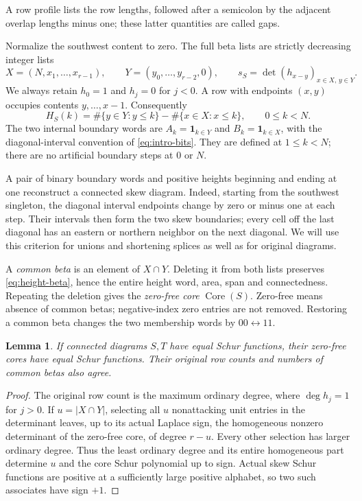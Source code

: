 \documentclass[11pt,a4paper]{amsart}
\numberwithin{equation}{section}
\theoremstyle{plain}
\newtheorem{lemma}[theorem]{Lemma}
\theoremstyle{definition}
\newcommand{\one}{\mathbf1}
\newcommand{\Core}{\operatorname{Core}}
\begin{document}
A row profile lists the row lengths, followed after a semicolon by the
adjacent overlap lengths minus one; these latter quantities are called gaps.

Normalize the southwest content to zero.  The full beta lists are strictly
decreasing integer lists
\[
 X=(N,x_1,\ldots,x_{r-1}),\qquad
 Y=(y_0,\ldots,y_{r-2},0),\qquad
 s_S=\det(h_{x-y})_{x\in X,\,y\in Y}.
\]
We always retain \(h_0=1\) and \(h_j=0\) for \(j<0\).
A row with endpoints \((x,y)\) occupies contents \(y,\ldots,x-1\).
Consequently
\begin{equation}\label{eq:height-beta}
 H_S(k)=\#\{y\in Y:y\le k\}-\#\{x\in X:x\le k\},
 \qquad 0\le k<N.
\end{equation}
The two internal boundary words are \(A_k=\one_{k\in Y}\) and
\(B_k=\one_{k\in X}\), with the diagonal-interval convention of
\eqref{eq:intro-bits}.  They are defined at \(1\le k<N\); there are no artificial
boundary steps at \(0\) or \(N\).

A pair of binary boundary words and positive heights beginning and ending at
one reconstruct a connected skew diagram.  Indeed, starting from the southwest
singleton, the diagonal interval endpoints change by zero or minus one at each
step.  Their intervals then form the two skew boundaries; every cell off the
last diagonal has an eastern or northern neighbor on the next diagonal.  We
will use this criterion for unions and shortening splices as well as for
original diagrams.

A \emph{common beta} is an element of \(X\cap Y\).  Deleting it from both lists
preserves \eqref{eq:height-beta}, hence the entire height word, area, span and
connectedness.  Repeating the deletion gives the \emph{zero-free core}
\(\Core(S)\).  Zero-free means absence of common betas; negative-index zero
entries are not removed.  Restoring a common beta changes the two membership
words by \(00\leftrightarrow11\).

\begin{lemma}\label{lem:core-class}
If connected diagrams \(S,T\) have equal Schur functions, their zero-free cores
have equal Schur functions.  Their original row counts and numbers of common
betas also agree.
\end{lemma}
\begin{proof}
The original row count is the maximum ordinary degree, where \(\deg h_j=1\)
for \(j>0\).  If \(u=|X\cap Y|\), selecting all \(u\) nonattacking unit entries in the
determinant leaves, up to its actual Laplace sign, the homogeneous nonzero
determinant of the zero-free core, of degree \(r-u\).  Every other selection has
larger ordinary degree.  Thus the least ordinary degree and its entire
homogeneous part determine \(u\) and the core Schur polynomial up to sign.
Actual skew Schur functions are positive at a sufficiently large positive
alphabet, so two such associates have sign \(+1\).
\end{proof}
\end{document}
